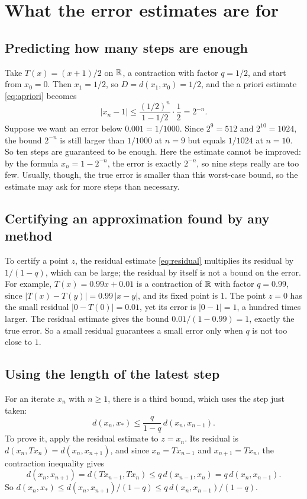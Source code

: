 \section{What the error estimates are for}\label{ch12:sec:estimates}
\subsection*{Predicting how many steps are enough}
Take $T(x)=(x+1)/2$ on $\mathbb R$, a contraction with factor $q=1/2$, and start from $x_0=0$. Then $x_1=1/2$, so $D=d(x_1,x_0)=1/2$, and the a priori estimate \eqref{eq:apriori} becomes
\[
|x_n-1|\le\frac{(1/2)^n}{1-1/2}\cdot\frac12=2^{-n}.
\]
Suppose we want an error below $0.001=1/1000$. Since $2^9=512$ and $2^{10}=1024$, the bound $2^{-n}$ is still larger than $1/1000$ at $n=9$ but equals $1/1024$ at $n=10$. So ten steps are guaranteed to be enough. Here the estimate cannot be improved: by the formula $x_n=1-2^{-n}$, the error is exactly $2^{-n}$, so nine steps really are too few. Usually, though, the true error is smaller than this worst-case bound, so the estimate may ask for more steps than necessary.

\subsection*{Certifying an approximation found by any method}
To certify a point $z$, the residual estimate \eqref{eq:residual} multiplies its residual by $1/(1-q)$, which can be large; the residual by itself is not a bound on the error. For example, $T(x)=0.99x+0.01$ is a contraction of $\mathbb R$ with factor $q=0.99$, since $|T(x)-T(y)|=0.99\,|x-y|$, and its fixed point is $1$. The point $z=0$ has the small residual $|0-T(0)|=0.01$, yet its error is $|0-1|=1$, a hundred times larger. The residual estimate gives the bound $0.01/(1-0.99)=1$, exactly the true error. So a small residual guarantees a small error only when $q$ is not too close to $1$.

\subsection*{Using the length of the latest step}
For an iterate $x_n$ with $n\ge1$, there is a third bound, which uses the step just taken:
\[
d(x_n,x_*)\le\frac{q}{1-q}\,d(x_n,x_{n-1}).
\]
To prove it, apply the residual estimate to $z=x_n$. Its residual is $d(x_n,Tx_n)=d(x_n,x_{n+1})$, and since $x_n=Tx_{n-1}$ and $x_{n+1}=Tx_n$, the contraction inequality gives
\[
d(x_n,x_{n+1})=d(Tx_{n-1},Tx_n)\le q\,d(x_{n-1},x_n)=q\,d(x_n,x_{n-1}).
\]
So $d(x_n,x_*)\le d(x_n,x_{n+1})/(1-q)\le q\,d(x_n,x_{n-1})/(1-q)$.

